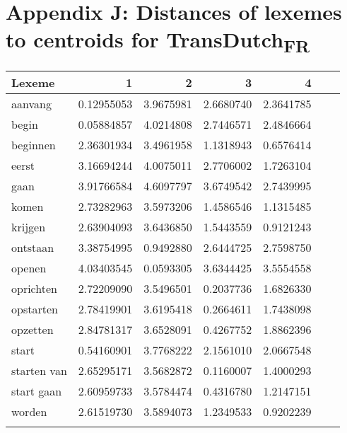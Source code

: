 \section*{Appendix J: Distances of lexemes to centroids for TransDutch\textsubscript{FR}}

\begin{tabularx}{\textwidth}{Xrrrrrr}
\lsptoprule
Lexeme        & 1         & 2          & 3         & 4         \\ \midrule
aanvang       & 0.12955053 & 3.9675981 & 2.6680740 & 2.3641785 \\
begin         & 0.05884857 & 4.0214808 & 2.7446571 & 2.4846664 \\          
beginnen      & 2.36301934 & 3.4961958 & 1.1318943 & 0.6576414 \\       
eerst         & 3.16694244 & 4.0075011 & 2.7706002 & 1.7263104 \\      
gaan          & 3.91766584 & 4.6097797 & 3.6749542 & 2.7439995 \\
komen         & 2.73282963 & 3.5973206 & 1.4586546 & 1.1315485 \\      
krijgen       & 2.63904093 & 3.6436850 & 1.5443559 & 0.9121243 \\  
ontstaan      & 3.38754995 & 0.9492880 & 2.6444725 & 2.7598750 \\      
openen        & 4.03403545 & 0.0593305 & 3.6344425 & 3.5554558 \\   
oprichten     & 2.72209090 & 3.5496501 & 0.2037736 & 1.6826330 \\
opstarten     & 2.78419901 & 3.6195418 & 0.2664611 & 1.7438098 \\  
opzetten      & 2.84781317 & 3.6528091 & 0.4267752 & 1.8862396 \\       
start         & 0.54160901 & 3.7768222 & 2.1561010 & 2.0667548 \\ 
starten van   & 2.65295171 & 3.5682872 & 0.1160007 & 1.4000293 \\
start gaan    & 2.60959733 & 3.5784474 & 0.4316780 & 1.2147151 \\
worden        & 2.61519730 & 3.5894073 & 1.2349533 & 0.9202239 \\
\lspbottomrule
\end{tabularx}
\normalsize
